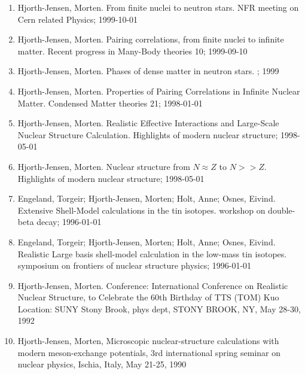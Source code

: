 \documentclass[a4wide,10pt]{article}
\begin{document}
\begin{enumerate}
\item Hjorth-Jensen, Morten. From finite nuclei to neutron stars. NFR meeting on Cern related Physics; 1999-10-01

\item Hjorth-Jensen, Morten. Pairing correlations, from finite nuclei to infinite matter. Recent progress in Many-Body theories 10; 1999-09-10

\item Hjorth-Jensen, Morten.  Phases of dense matter in neutron stars. ; 1999

\item Hjorth-Jensen, Morten. Properties of Pairing Correlations in Infinite Nuclear Matter. Condensed Matter theories 21; 1998-01-01

\item Hjorth-Jensen, Morten.  Realistic Effective Interactions and Large-Scale Nuclear Structure Calculation. Highlights of modern nuclear structure; 1998-05-01

\item Hjorth-Jensen, Morten. Nuclear structure from $N\approx Z$ to $N >>Z$. Highlights of modern nuclear structure; 1998-05-01

\item Engeland, Torgeir; Hjorth-Jensen, Morten; Holt, Anne; Osnes, Eivind. Extensive Shell-Model calculations in the tin isotopes. workshop on double-beta decay; 1996-01-01

\item Engeland, Torgeir; Hjorth-Jensen, Morten; Holt, Anne; Osnes, Eivind. Realistic Large basis shell-model calculation in the low-mass tin isotopes. symposium on frontiers of nuclear structure physics; 1996-01-01

\item Hjorth-Jensen, Morten.  Conference: International Conference on Realistic Nuclear Structure, to Celebrate the 60th Birthday of TTS (TOM) Kuo Location: SUNY Stony Brook, phys dept, STONY BROOK, NY, May 28-30, 1992

\item Hjorth-Jensen, Morten,  Microscopic nuclear-structure calculations with modern meson-exchange potentials, 3rd international spring seminar on nuclear physics, Ischia, Italy, May 21-25, 1990
\end{enumerate}

\end{document}
